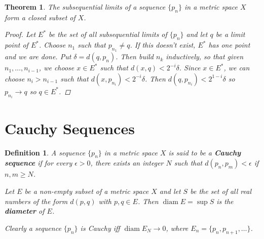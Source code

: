 \documentclass{scrbook}
\renewcommand{\to}{\rightarrow}
\DeclareMathOperator{\diam}{diam}
\newtheorem{theorem}{Theorem}
\newtheorem{definition}{Definition}
\begin{document}
\begin{theorem} %
The subsequential limits of a sequence $\{p_n\}$ in a metric space $X$ form a closed subset of $X$.

\begin{proof}
Let $E^*$ be the set of all subsequential limits of $\{p_n\}$ and let $q$ be a limit point of $E^*$. Choose $n_1$ such that $p_{n_1} \ne q$. If this doesn't exist, $E^*$ has one point and we are done. Put $\delta = d(q, p_n)$. Then build $n_k$ inductively, so that given $n_1, \dotsc, n_{i-1}$, we choose $x \in E^*$ such that $d(x, q) < 2^{-i} \delta$. Since $x \in E^*$, we can choose $n_i > n_{i-1}$ such that $d(x, p_{n_i}) < 2^{-i} \delta$. Then $d(q, p_{n_i}) < 2^{1-i} \delta$ so $p_{n_i} \to q$ so $q \in E^*$.
\end{proof}
\end{theorem}

\section{Cauchy Sequences}

\begin{definition}
A sequence $\{p_n\}$ in a metric space $X$ is said to be a \textbf{Cauchy sequence} if for every $\epsilon > 0$, there exists an integer $N$ such that $d(p_n, p_m) < \epsilon$ if $n, m \ge N$.

Let $E$ be a non-empty subset of a metric space $X$ and let $S$ be the set of all real numbers of the form $d(p, q)$ with $p, q \in E$. Then $\diam E = \sup S$ is the \textbf{diameter} of $E$.

Clearly a sequence $\{p_n\}$ is Cauchy iff $\diam E_N \to 0$, where $E_n = \{p_{n}, p_{n+1}, \dotsc\}$.
\end{definition}
\end{document}
